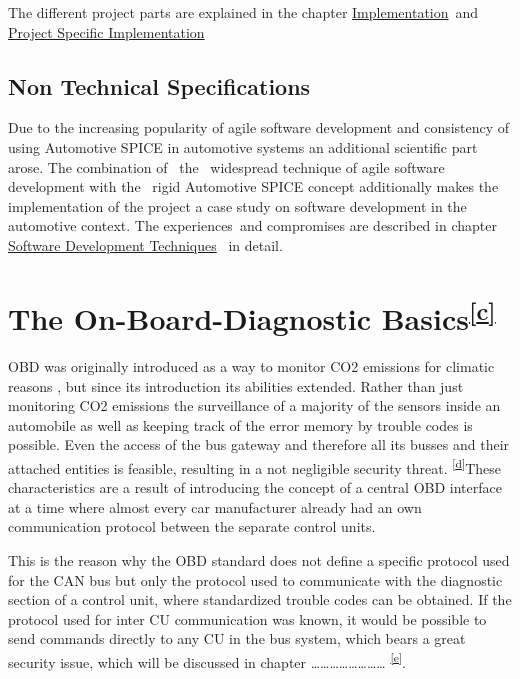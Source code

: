 {The different project parts are explained in the chapter
}{\protect\hyperlink{h.k3ecyfg5l7ib}{Implementation}}{~and
}{\protect\hyperlink{h.upb9og5wn4q0}{Project Specific Implementation}}

\hypertarget{h.56kfpodyq5td}{\subsection{\texorpdfstring{{Non Technical
Specifications}}{Non Technical Specifications}}\label{h.56kfpodyq5td}}

{Due to the increasing popularity of agile software development and
consistency of using Automotive SPICE in automotive systems an
additional scientific part arose. The combination of ~the ~widespread
technique of agile software development with the ~rigid Automotive SPICE
concept additionally makes the implementation of the project a case
study on software development in the automotive context. The
experience}{s}{~and compromises are described in chapter
}{\protect\hyperlink{h.totk00jqaso2}{Software Development Techniques}}{~
in detail.}{~}

\hypertarget{h.m62hdjh1p5au}{\section{\texorpdfstring{{The
On-Board-Diagnostic
Basics}\textsuperscript{\protect\hyperlink{cmnt3}{{[}c{]}}}}{The On-Board-Diagnostic Basics{[}c{]}}}\label{h.m62hdjh1p5au}}

{OBD was originally introduced as a way to monitor CO2 emissions for
climatic reasons , but since its introduction its }{abilities extended.
Rather than just monitoring CO2 emissions the surveillance of a majority
of the sensors inside an automobile as well as keeping track of the
error memory by trouble codes is possible. }{Even the access of the bus
gateway and therefore all its busses and their attached entities is
feasible, resulting in a not negligible security threat.
}\textsuperscript{\protect\hyperlink{cmnt4}{{[}d{]}}}{These
characteristics are a result of introducing the concept of a central OBD
interface at a time }{where }{almost every car manufacturer already had
an own communication protocol between the separate control units.}

{This is the reason why the OBD standard does not define a specific
protocol used for the CAN bus but only the protocol used to communicate
with the diagnostic section of a control unit, where standardized
trouble codes can be obtained. If the protocol used for inter CU
communication was known, it would be possible to send commands directly
to any CU in the bus system, which bears a great security issue, }{which
will be discussed in }{chapter
\ldots{}\ldots{}\ldots{}\ldots{}\ldots{}\ldots{}\ldots{}\ldots{}
}\textsuperscript{\protect\hyperlink{cmnt5}{{[}e{]}}}{.}

